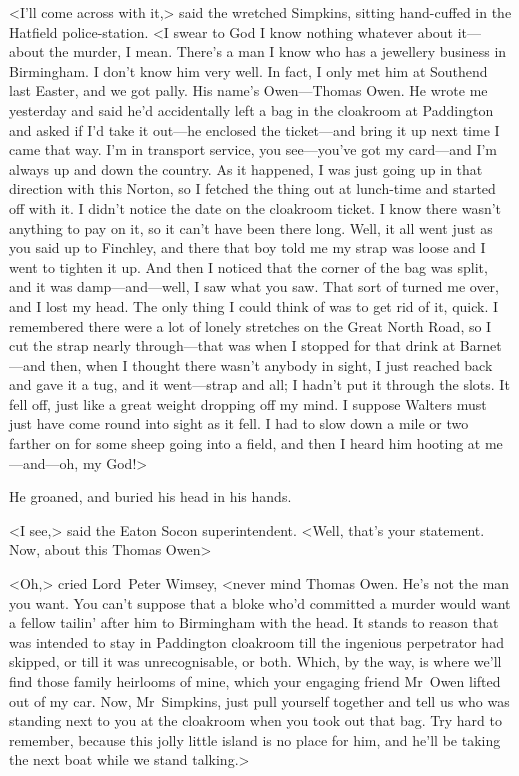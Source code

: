 \divider
<I'll come across with it,> said the wretched Simpkins, sitting hand-cuffed in the Hatfield police-station. <I swear to God I know nothing whatever about it—about the murder, I mean. There's a man I know who has a jewellery business in Birmingham. I don't know him very well. In fact, I only met him at Southend last Easter, and we got pally. His name's Owen—Thomas Owen. He wrote me yesterday and said he'd accidentally left a bag in the cloakroom at Paddington and asked if I'd take it out—he enclosed the ticket—and bring it up next time I came that way. I'm in transport service, you see—you've got my card—and I'm always up and down the country. As it happened, I was just going up in that direction with this Norton, so I fetched the thing out at lunch-time and started off with it. I didn't notice the date on the cloakroom ticket. I know there wasn't anything to pay on it, so it can't have been there long. Well, it all went just as you said up to Finchley, and there that boy told me my strap was loose and I went to tighten it up. And then I noticed that the corner of the bag was split, and it was damp—and—well, I saw what you saw. That sort of turned me over, and I lost my head. The only thing I could think of was to get rid of it, quick. I remembered there were a lot of lonely stretches on the Great North Road, so I cut the strap nearly through—that was when I stopped for that drink at Barnet—and then, when I thought there wasn't anybody in sight, I just reached back and gave it a tug, and it went—strap and all; I hadn't put it through the slots. It fell off, just like a great weight dropping off my mind. I suppose Walters must just have come round into sight as it fell. I had to slow down a mile or two farther on for some sheep going into a field, and then I heard him hooting at me—and—oh, my God!>

He groaned, and buried his head in his hands.

<I see,> said the Eaton Socon superintendent. <Well, that's your statement. Now, about this Thomas Owen\longdash>

<Oh,> cried Lord~Peter Wimsey, <never mind Thomas Owen. He's not the man you want. You can't suppose that a bloke who'd committed a murder would want a fellow tailin' after him to Birmingham with the head. It stands to reason that was intended to stay in Paddington cloakroom till the ingenious perpetrator had skipped, or till it was unrecognisable, or both. Which, by the way, is where we'll find those family heirlooms of mine, which your engaging friend Mr~Owen lifted out of my car. Now, Mr~Simpkins, just pull yourself together and tell us who was standing next to you at the cloakroom when you took out that bag. Try hard to remember, because this jolly little island is no place for him, and he'll be taking the next boat while we stand talking.>

